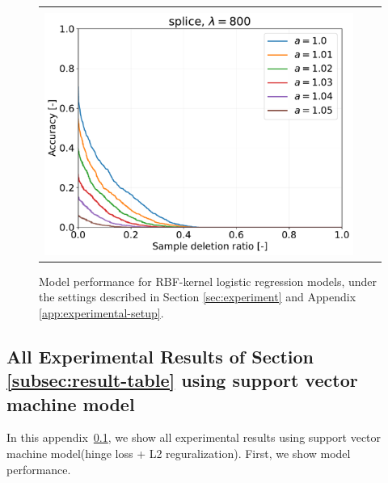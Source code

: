 \begin{figure}[H]
\begin{tabular}{ccc}
		\begin{minipage}[b]{0.3\hsize}\centering {\small Dataset: splice, $\lambda=n$}\\\includegraphics[width=0.8\hsize]{fig/table_logistic/splice_scale-logistic/kernel/kernel_ss_screening_rate_lam800_x_n_y_etest.pdf}\end{minipage}
		\\
	
	\end{tabular}
	\caption{Model performance for RBF-kernel logistic regression models, under the settings described in Section \ref{sec:experiment} and Appendix \ref{app:experimental-setup}.}
	\label{fig:result-guarantee-logistic}
	\end{figure}

	\newpage
\subsection{All Experimental Results of Section \ref{subsec:result-table} using support vector machine model} \label{app:result-svm}

In this appendix~\ref{app:result-svm}, we show all experimental results using support vector machine model(hinge loss + L2 reguralization). First, we show model performance.

